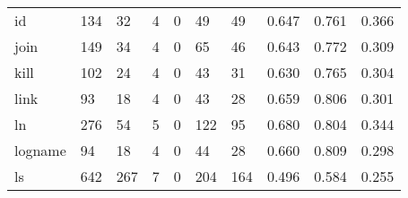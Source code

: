 \begin{longtable}{lp{2.0cm}p{2.0cm}p{2.0cm}p{2.0cm}p{2.0cm}p{2.0cm}p{2.0cm}p{2.0cm}p{2.0cm}}
id        &                    134 &                                 32 &                                 4 &                                0 &                                49 &                              49 &                                0.647 &                                  0.761 &                                0.366 \\
join      &                    149 &                                 34 &                                 4 &                                0 &                                65 &                              46 &                                0.643 &                                  0.772 &                                0.309 \\
kill      &                    102 &                                 24 &                                 4 &                                0 &                                43 &                              31 &                                0.630 &                                  0.765 &                                0.304 \\
link      &                     93 &                                 18 &                                 4 &                                0 &                                43 &                              28 &                                0.659 &                                  0.806 &                                0.301 \\
ln        &                    276 &                                 54 &                                 5 &                                0 &                               122 &                              95 &                                0.680 &                                  0.804 &                                0.344 \\
logname   &                     94 &                                 18 &                                 4 &                                0 &                                44 &                              28 &                                0.660 &                                  0.809 &                                0.298 \\
ls        &                    642 &                                267 &                                 7 &                                0 &                               204 &                             164 &                                0.496 &                                  0.584 &                                0.255 \\

\end{longtable}
